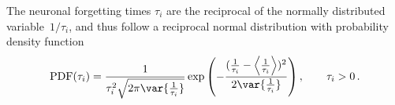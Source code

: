 %
The neuronal forgetting times $\tau_i$ are the reciprocal of the normally distributed variable~$1/\tau_i$, and thus follow a reciprocal normal distribution with probability density function
\begin{equation}
  \text{PDF}(\tau_i) = \frac{1}{\tau_i^2 \sqrt{2\pi \var{\frac{1}{\tau_i}}}} \exp\left( -\frac{(\frac{1}{\tau_i} - \left<\frac{1}{\tau_i}\right>)^2}{2\var{\frac{1}{\tau_i}}} \right), \qquad \tau_i > 0 \,.
\end{equation}
%
